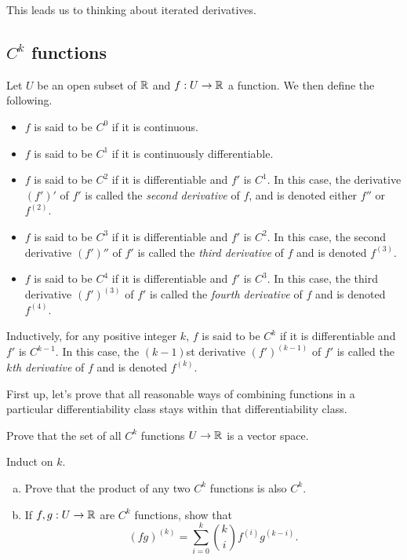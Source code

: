 This leads us to thinking about iterated derivatives. 

\subsection{\texorpdfstring{$C^k$}{Ck} functions}

\begin{definition} \label{ck-single} 
	Let $U$ be an open subset of $\mathbb{R}$ and $f : U \to \mathbb{R}$ a function. We then define the following. 
	\begin{itemize}
		\item $f$ is said to be $C^0$ if it is continuous. 
		\item $f$ is said to be $C^1$ if it is continuously differentiable. 
		\item $f$ is said to be $C^2$ if it is differentiable and $f'$ is $C^1$. In this case, the derivative $(f')'$ of $f'$ is called the \emph{second derivative} of $f$, and is denoted either $f''$ or $f^{(2)}$. 
		\item $f$ is said to be $C^3$ if it is differentiable and $f'$ is $C^2$.  In this case, the second derivative $(f')''$ of $f'$ is called the \emph{third derivative} of $f$ and is denoted $f^{(3)}$. 
		\item $f$ is said to be $C^4$ if it is differentiable and $f'$ is $C^3$.  In this case, the third derivative $(f')^{(3)}$ of $f'$ is called the \emph{fourth derivative} of $f$ and is denoted $f^{(4)}$. 
	\end{itemize}
	Inductively, for any positive integer $k$, $f$ is said to be $C^k$ if it is differentiable and $f'$ is $C^{k-1}$.  In this case, the $(k-1)$st derivative $(f')^{(k-1)}$ of $f'$ is called the \emph{$k$th derivative} of $f$ and is denoted $f^{(k)}$.  
\end{definition}

First up, let's prove that all reasonable ways of combining functions in a particular differentiability class stays within that differentiability class. 

\begin{exercise} \label{ck-stable-sum-scalar-single}
	Prove that the set of all $C^k$ functions $U \to \mathbb{R}$ is a vector space. 
	\begin{hint}
		Induct on $k$. 
	\end{hint}
\end{exercise}

\begin{exercise} \label{ck-stable-product-single}
	\begin{enumerate}[(a)]
		\item Prove that the product of any two $C^k$ functions is also $C^k$. 
		\item If $f, g : U \to \mathbb{R}$ are $C^k$ functions, show that
		\[ (fg)^{(k)} = \sum_{i = 0}^k \binom{k}{i} f^{(i)} g^{(k-i)}. \]
	\end{enumerate}
\end{exercise}

